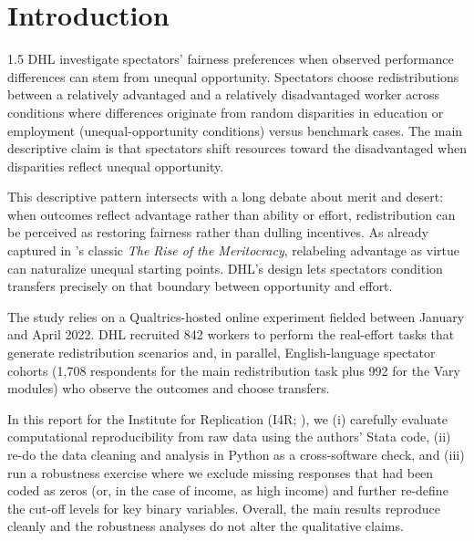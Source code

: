 \documentclass[12pt,a4paper]{article}
\begin{document}
\clearpage



\section{Introduction}
\begin{spacing}{1.5}
DHL investigate spectators' fairness preferences when observed performance differences can stem from unequal opportunity. Spectators choose redistributions between a relatively advantaged and a relatively disadvantaged worker across conditions where differences originate from random disparities in education or employment (unequal-opportunity conditions) versus benchmark cases. The main descriptive claim is that spectators shift resources toward the disadvantaged when disparities reflect unequal opportunity. 

This descriptive pattern intersects with a long debate about merit and desert: when outcomes reflect advantage rather than ability or effort, redistribution can be perceived as restoring fairness rather than dulling incentives. As already captured in \citet{young1958}'s classic \emph{The Rise of the Meritocracy}, relabeling advantage as virtue can naturalize unequal starting points. DHL's design lets spectators condition transfers precisely on that boundary between opportunity and effort.

The study relies on a Qualtrics-hosted online experiment fielded between January and April 2022. DHL recruited 842 workers to perform the real-effort tasks that generate redistribution scenarios and, in parallel, English-language spectator cohorts (1,708 respondents for the main redistribution task plus 992 for the Vary modules) who observe the outcomes and choose transfers.

In this report for the Institute for Replication (I4R; \citealp{I4R_MetaPaper}), we (i) carefully evaluate computational reproducibility from raw data using the authors' Stata code, (ii) re-do the data cleaning and analysis in Python as a cross-software check, and (iii) run a robustness exercise where we exclude missing responses that had been coded as zeros (or, in the case of income, as high income) and further re-define the cut-off levels for key binary variables.
Overall, the main results reproduce cleanly and the robustness analyses do not alter the qualitative claims.


\end{spacing}


\end{document}
